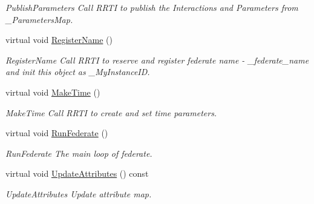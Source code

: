 \begin{DoxyCompactItemize}
\begin{DoxyCompactList}\small\item\em Publish\+Parameters Call R\+R\+TI to publish the Interactions and Parameters from \+\_\+\+Parameters\+Map. \end{DoxyCompactList}\item 
\mbox{\label{classUPIM_1_1UPIMFederate_a969238dc9129768d0b794b254e8614a3}} 
virtual void \hyperlink{classUPIM_1_1UPIMFederate_a969238dc9129768d0b794b254e8614a3}{Register\+Name} ()
\begin{DoxyCompactList}\small\item\em Register\+Name Call R\+R\+TI to reserve and register federate name -\/ \+\_\+federate\+\_\+name and init this object as \+\_\+\+My\+Instance\+ID. \end{DoxyCompactList}\item 
\mbox{\label{classUPIM_1_1UPIMFederate_a1e5160846411fa61673f1bc78ef806df}} 
virtual void \hyperlink{classUPIM_1_1UPIMFederate_a1e5160846411fa61673f1bc78ef806df}{Make\+Time} ()
\begin{DoxyCompactList}\small\item\em Make\+Time Call R\+R\+TI to create and set time parameters. \end{DoxyCompactList}\item 
\mbox{\label{classUPIM_1_1UPIMFederate_a940292d701e680eaae55f394bcfc50db}} 
virtual void \hyperlink{classUPIM_1_1UPIMFederate_a940292d701e680eaae55f394bcfc50db}{Run\+Federate} ()
\begin{DoxyCompactList}\small\item\em Run\+Federate The main loop of federate. \end{DoxyCompactList}\item 
\mbox{\label{classUPIM_1_1UPIMFederate_af3e962115b8fb2ae4e5fd05468437a2c}} 
virtual void \hyperlink{classUPIM_1_1UPIMFederate_af3e962115b8fb2ae4e5fd05468437a2c}{Update\+Attributes} () const
\begin{DoxyCompactList}\small\item\em Update\+Attributes Update attribute map. \end{DoxyCompactList}\item 
\mbox{\label{classUPIM_1_1UPIMFederate_a1a5150d7771e9b8ae0dc63b06a450b39}} 

\end{DoxyCompactItemize}
